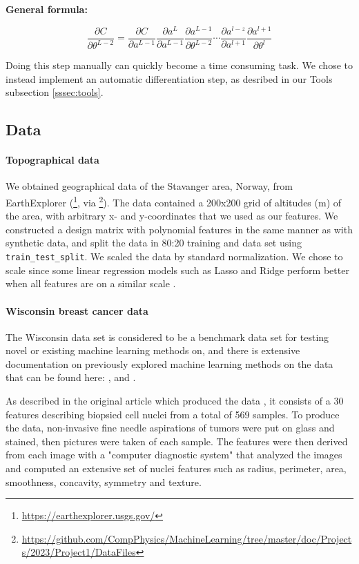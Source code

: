\textbf{General formula:}

\[
\frac{\partial C}{\partial \theta^{L-2}} = \frac{\partial C}{\partial a^{L-1}} \frac{\partial a^L}{\partial a^{L-1}} \frac{\partial a^{L-1}}{\partial \theta^{L-2}} \cdots \frac{\partial a^{l-z}}{\partial a^{l+1}} \frac{\partial a^{l+1}}{\partial \theta^l}
\]

Doing this step manually can quickly become a time consuming task. We chose to instead implement an automatic 
differentiation step, as desribed in our Tools subsection \ref{sssec:tools}.



\subsection{Data}\label{ssec:data}
%
\paragraph*{Topographical data}
We obtained geographical data of the Stavanger area, Norway, from EarthExplorer (\footnote{\url{https://earthexplorer.usgs.gov/}}, 
via \footnote{\url{https://github.com/CompPhysics/MachineLearning/tree/master/doc/Projects/2023/Project1/DataFiles}}). 
The data contained a 200x200 grid of altitudes (m) of the area, with arbitrary x- and y-coordinates that we used as our features. 
We constructed a design matrix with polynomial features in the same manner as with synthetic data, and split the data in 80:20 training 
and data set using \texttt{train\_test\_split}. We scaled the data by standard normalization. We chose to scale since some linear regression 
models such as Lasso and Ridge perform better when all features are on a similar scale \supercite{raschka2019}. 
\\
\paragraph*{Wisconsin breast cancer data}
The Wisconsin data set \cite{bc_wisconsin} is considered to be a benchmark data set for testing novel or existing machine learning methods on, and 
there is extensive documentation on previously explored machine learning methods on the data that can be found here: 
\cite{wisconsin_example1}, \cite{wisconsin_example2} and \cite{wisconsin_example3}.

As described in the original article which produced the data \cite{first_wisconsin}, it consists of a 30 features describing biopsied cell nuclei from 
a total of 569 samples. To produce the data, non-invasive fine needle aspirations of tumors were put on glass and stained, 
then pictures were taken of each sample. The features were then derived from each image with a "computer diagnostic system" that 
analyzed the images and computed an extensive set of nuclei features such as radius, perimeter, area, smoothness, concavity, symmetry and texture. 


